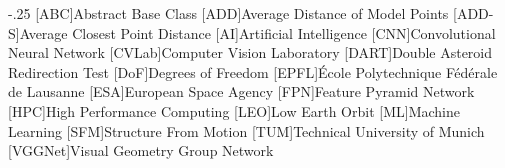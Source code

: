 \documentclass[headsepline,footsepline,footinclude=false,oneside,fontsize=10pt,paper=a4,listof=totoc,bibliography=totoc]{scrbook} %
\begin{document}


\frontmatter{}

%
%



\tableofcontents{}

\mainmatter{}









\begin{acronym}
\itemsep-.25\baselineskip
	[ABC]{Abstract Base Class}
	[ADD]{Average Distance of Model Points}
	[ADD-S]{Average Closest Point Distance}
	[AI]{Artificial Intelligence}
	[CNN]{Convolutional Neural Network}
	[CVLab]{Computer Vision Laboratory}
	[DART]{Double Asteroid Redirection Test}
	[DoF]{Degrees of Freedom}
	[EPFL]{École Polytechnique Fédérale de Lausanne}
	[ESA]{European Space Agency}
	[FPN]{Feature Pyramid Network}
	[HPC]{High Performance Computing}
	[LEO]{Low Earth Orbit}
	[ML]{Machine Learning}
	[SFM]{Structure From Motion}
	[TUM]{Technical University of Munich}
	[VGGNet]{Visual Geometry Group Network}
\end{acronym}

\cleardoublepage{}


\appendix{}
\renewcommand{\thelstlisting}{A.\arabic{lstlisting}}
\setcounter{lstlisting}{0} %

\setcounter{lstlisting}{0}
\renewcommand{\thelstlisting}{B.\arabic{lstlisting}}


\printbibliography{}
\end{document}
